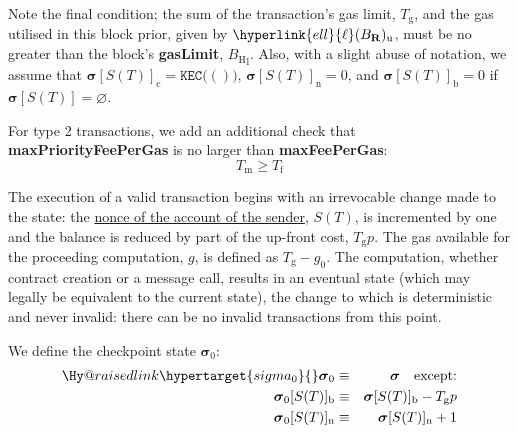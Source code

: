 \documentclass[9pt,oneside]{amsart}
\makeatletter
\newcommand{\linkdest}[1]{\Hy@raisedlink{\hypertarget{#1}{}}}
\makeatother
\begin{document}
\begin{multicols}{2}
Note the final condition; the sum of the transaction's gas limit, $T_{\mathrm{g}}$, and the gas utilised in this block prior, given by $\hyperlink{ell}{\ell}(B_{\mathbf{R}})_{\mathrm{u}}$, must be no greater than the block's \textbf{gasLimit}, ${B_{\mathrm{H}}}_{\mathrm{l}}$.
Also, with a slight abuse of notation, we assume that $\boldsymbol{\sigma}[S(T)]_{\mathrm{c}} = \texttt{KEC}\big( () \big)$, $\boldsymbol{\sigma}[S(T)]_{\mathrm{n}} = 0$, and $\boldsymbol{\sigma}[S(T)]_{\mathrm{b}} = 0$ if $\boldsymbol{\sigma}[S(T)] = \varnothing$.

For type 2 transactions, we add an additional check that \textbf{maxPriorityFeePerGas} is no larger than \textbf{maxFeePerGas}:
\begin{equation}
  T_{\mathrm{m}} \geqslant T_{\mathrm{f}}
\end{equation}

The execution of a valid transaction begins with an irrevocable change made to the state: the \hyperlink{account_nonce}{nonce of the account of the sender}, $S(T)$, is incremented by one and the balance is reduced by part of the up-front cost, $T_{\mathrm{g}} p$. The gas available for the proceeding computation, $g$, is defined as $T_{\mathrm{g}} - g_0$. The computation, whether contract creation or a message call, results in an eventual state (which may legally be equivalent to the current state), the change to which is deterministic and never invalid: there can be no invalid transactions from this point.

We define the checkpoint state $\boldsymbol{\sigma}_0$:
\begin{eqnarray}
\linkdest{sigma_0}{}\boldsymbol{\sigma}_0 & \equiv & \boldsymbol{\sigma} \quad \text{except:} \\
\boldsymbol{\sigma}_0[S(T)]_{\mathrm{b}} & \equiv & \boldsymbol{\sigma}[S(T)]_{\mathrm{b}} - T_{\mathrm{g}} p \\
\boldsymbol{\sigma}_0[S(T)]_{\mathrm{n}} & \equiv & \boldsymbol{\sigma}[S(T)]_{\mathrm{n}} + 1
\end{eqnarray}


\end{multicols}
\end{document}
